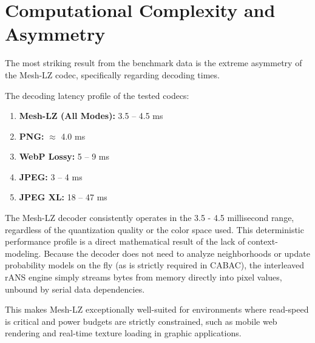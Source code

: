 \section{Computational Complexity and Asymmetry}

The most striking result from the benchmark data is the extreme asymmetry of the Mesh-LZ codec, specifically regarding decoding times.

The decoding latency profile of the tested codecs:
\begin{enumerate}
    \item \textbf{Mesh-LZ (All Modes):} 3.5 -- 4.5 ms
    \item \textbf{PNG:} $\approx$ 4.0 ms
    \item \textbf{WebP Lossy:} 5 -- 9 ms
    \item \textbf{JPEG:} 3 -- 4 ms
    \item \textbf{JPEG XL:} 18 -- 47 ms
\end{enumerate}

The Mesh-LZ decoder consistently operates in the 3.5 - 4.5 millisecond range, regardless of the quantization quality or the color space used. This deterministic performance profile is a direct mathematical result of the lack of context-modeling. Because the decoder does not need to analyze neighborhoods or update probability models on the fly (as is strictly required in CABAC), the interleaved rANS engine simply streams bytes from memory directly into pixel values, unbound by serial data dependencies. 

This makes Mesh-LZ exceptionally well-suited for environments where read-speed is critical and power budgets are strictly constrained, such as mobile web rendering and real-time texture loading in graphic applications.
